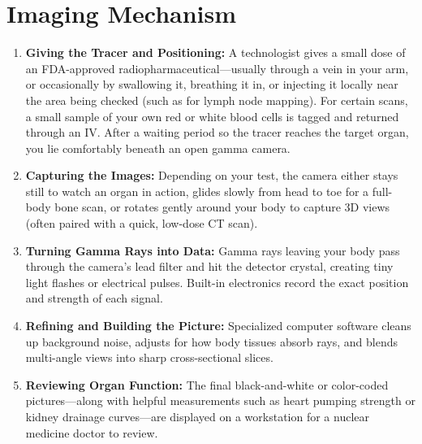 \section{Imaging Mechanism}
\begin{enumerate}
\item \textbf{Giving the Tracer and Positioning:} A technologist gives a small dose of an FDA-approved radiopharmaceutical---usually through a vein in your arm, or occasionally by swallowing it, breathing it in, or injecting it locally near the area being checked (such as for lymph node mapping). For certain scans, a small sample of your own red or white blood cells is tagged and returned through an IV. After a waiting period so the tracer reaches the target organ, you lie comfortably beneath an open gamma camera.
\item \textbf{Capturing the Images:} Depending on your test, the camera either stays still to watch an organ in action, glides slowly from head to toe for a full-body bone scan, or rotates gently around your body to capture 3D views (often paired with a quick, low-dose CT scan).
\item \textbf{Turning Gamma Rays into Data:} Gamma rays leaving your body pass through the camera's lead filter and hit the detector crystal, creating tiny light flashes or electrical pulses. Built-in electronics record the exact position and strength of each signal.
\item \textbf{Refining and Building the Picture:} Specialized computer software cleans up background noise, adjusts for how body tissues absorb rays, and blends multi-angle views into sharp cross-sectional slices.
\item \textbf{Reviewing Organ Function:} The final black-and-white or color-coded pictures---along with helpful measurements such as heart pumping strength or kidney drainage curves---are displayed on a workstation for a nuclear medicine doctor to review.
\end{enumerate}

